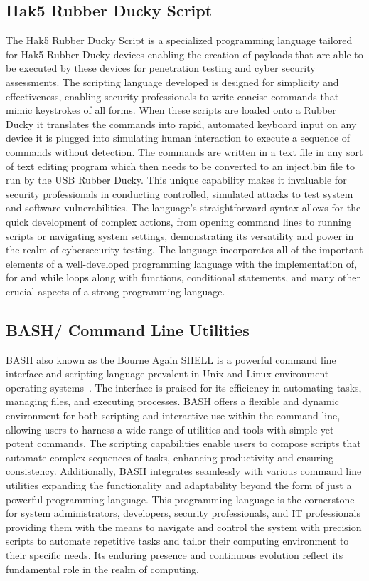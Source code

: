 \documentclass[manuscript,acmsmall,anonymous,review,screen,nonacm=true, authorversion=true]{acmart}
\begin{document}
\subsection{Hak5 Rubber Ducky Script}
The Hak5 Rubber Ducky Script is a specialized programming language tailored for Hak5
Rubber Ducky devices enabling the creation of payloads that are able to be executed by these
devices for penetration testing and cyber security assessments. The scripting language
developed is designed for simplicity and effectiveness, enabling security professionals to write
concise commands that mimic keystrokes of all forms. When these scripts are loaded onto
a Rubber Ducky it translates the commands into rapid, automated keyboard input on any device
it is plugged into simulating human interaction to execute a sequence of commands without
detection. The commands are written in a text file in any sort of text editing program
which then needs to be converted to an inject.bin file to run by the USB Rubber Ducky.
This unique capability makes it invaluable for security professionals in conducting controlled,
simulated attacks to test system and software vulnerabilities. The language's
straightforward syntax allows for the quick development of complex actions, from opening
command lines to running scripts or navigating system settings, demonstrating its versatility and
power in the realm of cybersecurity testing. The language incorporates all of the important elements of a well-developed programming language with the implementation of, for and while
loops along with functions, conditional statements, and many other crucial aspects of a strong
programming language.

\subsection{ BASH/ Command Line Utilities}
BASH also known as the Bourne Again SHELL is a powerful command line interface
and scripting language prevalent in Unix and Linux environment operating systems~\cite{bash1,bash2}.
The interface is praised for its efficiency in automating tasks, managing files, and executing
processes. BASH offers a flexible and dynamic environment for both scripting and
interactive use within the command line, allowing users to harness a wide range of utilities and
tools with simple yet potent commands. The scripting capabilities enable users to
compose scripts that automate complex sequences of tasks, enhancing productivity and ensuring
consistency. Additionally, BASH integrates seamlessly with various command line
utilities expanding the functionality and adaptability beyond the form of just a powerful
programming language. This programming language is the cornerstone for system
administrators, developers, security professionals, and IT professionals providing them with the
means to navigate and control the system with precision scripts to automate repetitive tasks and
tailor their computing environment to their specific needs. Its enduring presence and
continuous evolution reflect its fundamental role in the realm of computing.
\end{document}
